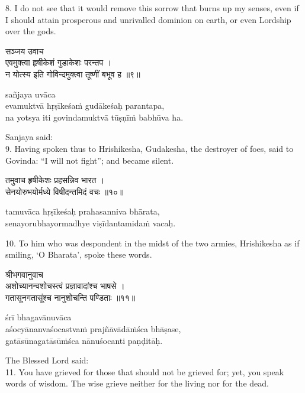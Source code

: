 8. I do not see that it would remove this sorrow that burns up my senses, even
if I should attain prosperous and unrivalled dominion on earth, or even
Lordship over the gods.

\begin{gitaverse}
सञ्जय उवाच \\
एवमुक्त्वा हृषीकेशं गुडाकेशः परन्तप । \\
न योत्स्य इति गोविन्दमुक्त्वा तूष्णीं बभूव ह ॥९॥
\end{gitaverse}

\begin{transliteration}
sañjaya uvāca \\
evamuktvā hṛṣīkeśaṁ gudākeśaḥ parantapa, \\
na yotsya iti govindamuktvā tūṣṇīṁ babhūva ha.
\end{transliteration}

Sanjaya said: \\
9. Having spoken thus to Hrishikesha, Gudakesha, the destroyer of foes, said to
Govinda: ``I will not fight''; and became silent.

\begin{gitaverse}
तमुवाच हृषीकेशः प्रहसन्निव भारत । \\
सेनयोरुभयोर्मध्ये विषीदन्तमिदं वचः ॥१०॥
\end{gitaverse}

\begin{transliteration}
tamuvāca hṛṣīkeśaḥ prahasanniva bhārata, \\
senayorubhayormadhye viṣīdantamidaṁ vacaḥ.
\end{transliteration}

10. To him who was despondent in the midst of the two armies, Hrishikesha as if
smiling, `O Bharata', spoke these words.

\begin{gitaverse}
श्रीभगवानुवाच \\
अशोच्यानन्वशोचस्त्वं प्रज्ञावादांश्च भाषसे । \\
गतासूनगतासूंश्च नानुशोचन्ति पण्डिताः ॥११॥
\end{gitaverse}

\begin{transliteration}
śrī bhagavānuvāca \\
aśocyānanvaśocastvaṁ prajñāvādāṁśca bhāṣase, \\
gatāsūnagatāsūṁśca nānuśocanti paṇḍitāḥ.
\end{transliteration}

The Blessed Lord said: \\
11. You have grieved for those that should not be grieved for; yet, you speak
words of wisdom. The wise grieve neither for the living nor for the dead.

